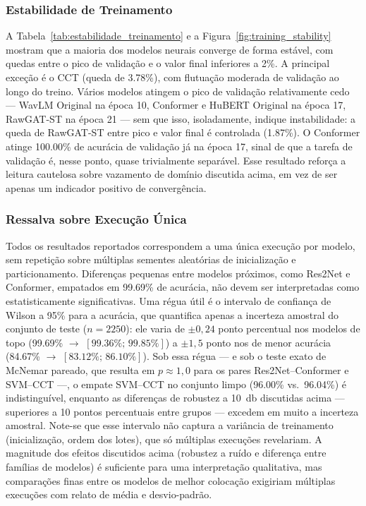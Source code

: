 \documentclass[12pt,a4paper]{article}
\begin{document}
\subsubsection*{Estabilidade de Treinamento}

A Tabela~\ref{tab:estabilidade_treinamento} e a
Figura~\ref{fig:training_stability} mostram que a maioria dos modelos neurais
converge de forma estável, com quedas entre o pico de validação e o valor final
inferiores a \num{2}\%. A principal exceção é o CCT (queda de \num{3,78}\%),
com flutuação moderada de validação ao longo do treino. Vários modelos atingem
o pico de validação relativamente cedo --- WavLM Original na época \num{10},
Conformer e HuBERT Original na época \num{17}, RawGAT-ST na época \num{21} ---
sem que isso, isoladamente, indique instabilidade: a queda de RawGAT-ST entre
pico e valor final é controlada (\num{1,87}\%). O Conformer atinge
\num{100,00}\% de acurácia de validação já na época \num{17}, sinal de que a
tarefa de validação é, nesse ponto, quase trivialmente separável. Esse
resultado reforça a leitura cautelosa sobre vazamento de domínio discutida
acima, em vez de ser apenas um indicador positivo de convergência.

\subsubsection*{Ressalva sobre Execução Única}

Todos os resultados reportados correspondem a uma única execução por modelo, sem
repetição sobre múltiplas sementes aleatórias de inicialização e
particionamento. Diferenças pequenas entre modelos próximos, como Res2Net e
Conformer, empatados em \num{99,69}\% de acurácia, não devem ser interpretadas
como estatisticamente significativas. Uma régua útil é o intervalo de
confiança de Wilson a \num{95}\% para a acurácia, que quantifica apenas a
incerteza amostral do conjunto de teste ($n = \num[group-minimum-digits=4]{2250}$): ele varia de
$\pm 0{,}24$ ponto percentual nos modelos de topo (\num{99,69}\% $\rightarrow$
$[\num{99,36}\%;\, \num{99,85}\%]$) a $\pm 1{,}5$ ponto nos de menor acurácia
(\num{84,67}\% $\rightarrow$ $[\num{83,12}\%;\, \num{86,10}\%]$). Sob essa
régua --- e sob o teste exato de McNemar pareado, que resulta em
$p \approx 1{,}0$ para os pares Res2Net--Conformer e SVM--CCT ---, o empate
SVM--CCT no conjunto limpo (\num{96,00}\% vs.\ \num{96,04}\%)
é indistinguível, enquanto as diferenças de robustez a \SI{10}{\decibel}
discutidas acima --- superiores a \num{10} pontos percentuais entre grupos ---
excedem em muito a incerteza amostral. Note-se que esse intervalo não captura
a variância de treinamento (inicialização, ordem dos lotes), que só múltiplas
execuções revelariam. A magnitude dos efeitos discutidos acima
(robustez a ruído e diferença entre famílias de modelos) é suficiente para uma
interpretação qualitativa, mas comparações finas entre os modelos de melhor
colocação exigiriam múltiplas execuções com relato de média e desvio-padrão.
\end{document}
